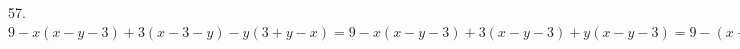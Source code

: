 57. $9-x(x-y-3)+3(x-3-y)-y(3+y-x)=9-x(x-y-3)+3(x-y-3)+y(x-y-3)=9-(x-y-3)(x-y-3)=9-(x-y-3)^2=(3-x+y+3)(3+x-y-3)=(x-y)(y-x+6).$\\
